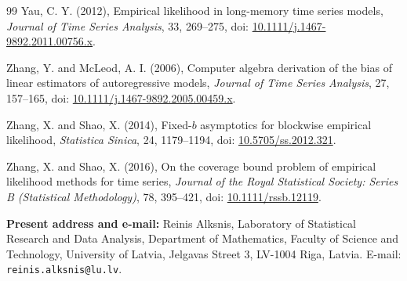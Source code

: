 \documentclass[12pt]{article}
\theoremstyle{remark}
\begin{document}
\begin{thebibliography}{99}
Yau, C. Y. (2012), Empirical likelihood in long-memory time series models, \emph{Journal of Time Series Analysis}, 33, 269--275, doi: \href{https://doi.org/10.1111/j.1467-9892.2011.00756.x}{10.1111/j.1467-9892.2011.00756.x}.

Zhang, Y. and McLeod, A. I. (2006), Computer algebra derivation of the bias of linear estimators of autoregressive models, \emph{Journal of Time Series Analysis}, 27, 157--165, doi: \href{https://doi.org/10.1111/j.1467-9892.2005.00459.x}{10.1111/j.1467-9892.2005.00459.x}.

Zhang, X. and Shao, X. (2014), Fixed-$b$ asymptotics for blockwise empirical likelihood, \emph{Statistica Sinica}, 24, 1179--1194, doi: \href{https://doi.org/10.5705/ss.2012.321}{10.5705/ss.2012.321}.

Zhang, X. and Shao, X. (2016), On the coverage bound problem of empirical likelihood methods for time series, \emph{Journal of the Royal Statistical Society: Series B (Statistical Methodology)}, 78, 395--421, doi: \href{https://doi.org/10.1111/rssb.12119}{10.1111/rssb.12119}.
\end{thebibliography}

\smallskip
{\small\noindent\textbf{Present address and e-mail:} Reinis Alksnis, Laboratory of Statistical Research and Data Analysis, Department of Mathematics, Faculty of Science and Technology, University of Latvia, Jelgavas Street 3, LV-1004 Riga, Latvia. E-mail: \texttt{reinis.alksnis@lu.lv}.}
\end{document}
